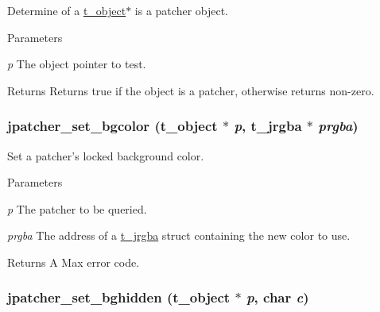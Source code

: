 Determine of a \hyperlink{structt__object}{t\_\-object}$\ast$ is a patcher object. 
\begin{DoxyParams}{Parameters}
\item[{\em p}]The object pointer to test. \end{DoxyParams}
\begin{DoxyReturn}{Returns}
Returns true if the object is a patcher, otherwise returns non-\/zero. 
\end{DoxyReturn}
\hypertarget{group__jpatcher_ga2ddf7d6edaf305c425108a96cb32b62d}{
\subsubsection[{jpatcher\_\-set\_\-bgcolor}]{ jpatcher\_\-set\_\-bgcolor ({\bf t\_\-object} $\ast$ {\em p}, \/  {\bf t\_\-jrgba} $\ast$ {\em prgba})}}
\label{group__jpatcher_ga2ddf7d6edaf305c425108a96cb32b62d}


Set a patcher's locked background color. 
\begin{DoxyParams}{Parameters}
\item[{\em p}]The patcher to be queried. \item[{\em prgba}]The address of a \hyperlink{structt__jrgba}{t\_\-jrgba} struct containing the new color to use. \end{DoxyParams}
\begin{DoxyReturn}{Returns}
A Max error code. 
\end{DoxyReturn}
\hypertarget{group__jpatcher_gaace70353f26b52b10d5926ab0a6c9395}{
\subsubsection[{jpatcher\_\-set\_\-bghidden}]{ jpatcher\_\-set\_\-bghidden ({\bf t\_\-object} $\ast$ {\em p}, \/  char {\em c})}}
\label{group__jpatcher_gaace70353f26b52b10d5926ab0a6c9395}


